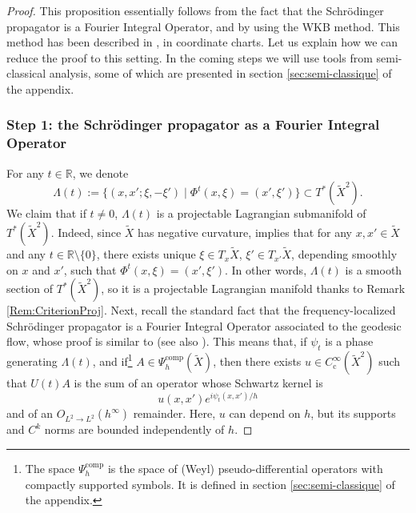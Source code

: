 \documentclass[JEP,XML,SOM,Unicode,published]{cedram}
\let\sep\mid
\newcommand{\rc}{\mathrm{c}}
\newcommand{\comp}{\mathrm{comp}}
\theoremstyle{plain}
\theoremstyle{definition}
\newcommand{\R}{\mathbb{R}}
\begin{document}
\begin{proof}
This proposition essentially follows from the fact that the Schrödinger propagator is a Fourier Integral Operator, and by using the WKB method. This method has been described in \cite[Lem.\,4.1]{NZ}, in coordinate charts. Let us explain how we can reduce the proof to this setting. In the coming steps we will use tools from semi-classical analysis, some of which are presented in section \ref{sec:semi-classique} of the appendix.

\subsubsection*{Step 1: the Schrödinger propagator as a Fourier Integral Operator}
For any $t\in \R$, we denote
\[
\Lambda(t):= \{(x,x'; \xi, -\xi')\sep \Phi^t(x,\xi)= (x', \xi')\} \subset T^*(\widetilde{X}^2).
\]
We claim that if $t\neq 0$, $\Lambda(t)$ is a projectable Lagrangian submanifold of $T^*(\widetilde{X}^2)$. Indeed, since $\widetilde{X}$ has negative curvature, \cite[Th.\,4.8.1]{Jost} implies that for any $x,x'\in \widetilde{X}$ and any $t\in \R\setminus\{0\}$, there exists unique $\xi\in T_x\widetilde{X}$, $\xi'\in T_{x'}\widetilde{X}$, depending smoothly on $x$ and $x'$, such that $\Phi^t(x,\xi)= (x', \xi')$. In other words, $\Lambda(t)$ is a smooth section of $T^*(\widetilde{X}^2)$, so it is a projectable Lagrangian manifold thanks to Remark \ref{Rem:CriterionProj}. Next, recall the standard fact that the frequency-localized Schrödinger propagator is a Fourier Integral Operator associated to the geodesic flow, whose proof is similar to \cite[Th.\,2.1]{LapSig} (see also \cite[Th.\,10.4]{Zworski_2012}). This means that, if $\psi_t$ is a phase generating $\Lambda(t)$, and if\footnote{The space $\Psi_h^{\comp}$ is the space of (Weyl) pseudo-differential operators with compactly supported symbols. It is defined in section \ref{sec:semi-classique} of the appendix.} $A\in \Psi_h^{\comp}(\widetilde{X})$, then there exists $u\in C_\rc^\infty(\widetilde{X}^2)$ such that $U(t)A$ is the sum of an operator whose Schwartz kernel is
\[
u(x,x') e^{i\psi_t(x,x')/h}
\]
and of an $O_{L^2\to L^2}(h^\infty)$ remainder. Here, $u$ can depend on $h$, but its supports and $C^k$ norms are bounded independently of $h$.


\end{proof}
\end{document}
